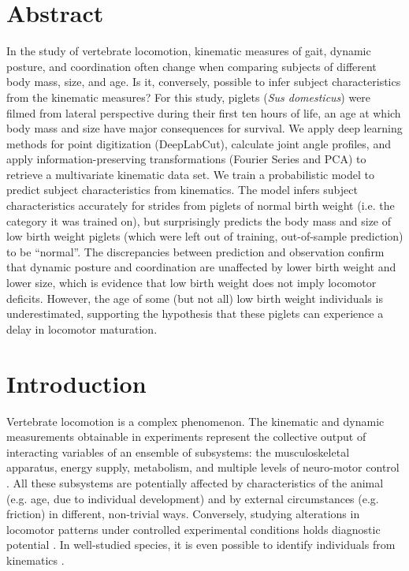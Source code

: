 \clearpage
\section{Abstract}
\label{abstract_22}
In the study of vertebrate locomotion, kinematic measures of gait, dynamic posture, and coordination often change when comparing subjects of different body mass, size, and age.
Is it, conversely, possible to infer subject characteristics from the kinematic measures?
For this study, piglets (\textit{Sus domesticus}) were filmed from lateral perspective during their first ten hours of life, an age at which body mass and size have major consequences for survival.
We apply deep learning methods for point digitization (DeepLabCut), calculate joint angle profiles, and apply information-preserving transformations (Fourier Series and PCA) to retrieve a multivariate kinematic data set.
We train a probabilistic model to predict subject characteristics from kinematics.
The model infers subject characteristics accurately for strides from piglets of normal birth weight (i.e. the category it was trained on), but surprisingly predicts the body mass and size of low birth weight piglets (which were left out of training, out-of-sample prediction) to be ``normal''.
The discrepancies between prediction and observation confirm that dynamic posture and coordination are unaffected by lower birth weight and lower size, which is evidence that low birth weight does not imply locomotor deficits.
However, the age of some (but not all) low birth weight individuals is underestimated, supporting the hypothesis that these piglets can experience a delay in locomotor maturation.

\FloatBarrier
\clearpage
\section{Introduction}
\label{intro_22}
Vertebrate locomotion is a complex phenomenon.
The kinematic and dynamic measurements obtainable in experiments represent the collective output of interacting variables of an ensemble of subsystems:
the musculoskeletal apparatus, energy supply, metabolism, and multiple levels of neuro-motor control \citep{Nishikawa2007}.
All these subsystems are potentially affected by characteristics of the animal (e.g. age, due to individual development) and by external circumstances (e.g. friction) in different, non-trivial ways.
Conversely, studying alterations in locomotor patterns under controlled experimental conditions holds diagnostic potential \citep[e.g.][]{Figueiredo2018}.
In well-studied species, it is even possible to identify individuals from kinematics \citep[e.g.][]{Patua2021}.


